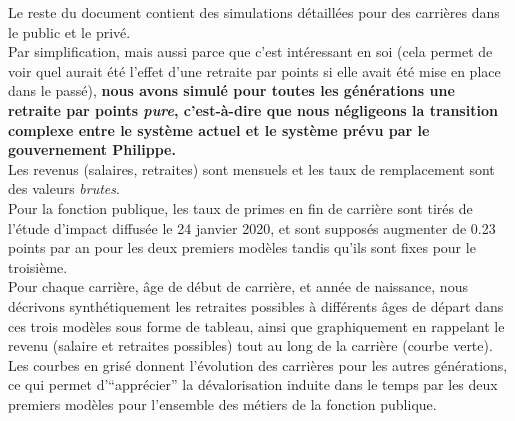 Le reste du document contient des simulations détaillées pour des carrières dans le public et le privé. \\
Par simplification, mais aussi parce que c'est intéressant en soi (cela permet de voir quel aurait été l'effet d'une retraite par points si elle avait été mise en place dans le passé), {\bf nous avons simulé pour toutes les générations une retraite par points \emph{pure}, c'est-à-dire que nous négligeons la transition complexe entre le système actuel et le système prévu par le gouvernement Philippe.}\\
Les revenus (salaires, retraites) sont mensuels et les taux de remplacement sont des valeurs \emph{brutes}.\\
Pour la fonction publique, les taux de primes en fin de carrière sont tirés de l'étude d'impact diffusée le 24 janvier 2020, et sont supposés augmenter de 0.23 points par an pour les deux premiers modèles tandis qu'ils sont fixes pour le troisième.\\
Pour chaque carrière, âge de début de carrière, et année de naissance, nous décrivons synthétiquement les retraites possibles à différents âges de départ dans ces trois modèles sous forme de tableau, ainsi que graphiquement en rappelant le revenu (salaire et retraites possibles) tout au long de la carrière (courbe verte). Les courbes en grisé donnent l'évolution des carrières pour les autres générations, ce qui permet d'``apprécier'' la dévalorisation induite dans le temps par les deux premiers modèles pour l'ensemble des métiers de la fonction publique.  

\newpage
